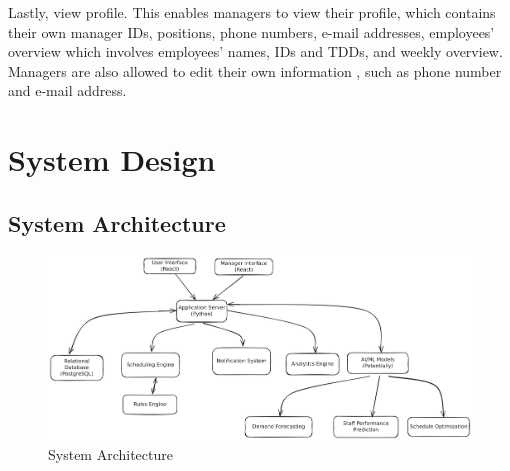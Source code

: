 \documentclass[a4paper,12pt, oneside]{report}
\begin{document}
Lastly, view profile. This enables managers to view their profile, which contains their own manager IDs, positions, phone numbers, e-mail addresses, employees’ overview which involves employees’ names, IDs and TDDs, and weekly overview. Managers are also allowed to edit their own information	, such as phone number and e-mail address. \\

\chapter{System Design}
\section{System Architecture}
\begin{figure}[H]
    \centering
    \includegraphics[width=\linewidth]{UMLDiagrams/sys_architecture_v2.png}
    \caption{System Architecture}
    \label{fig:sys-arc}
\end{figure}
\end{document}
